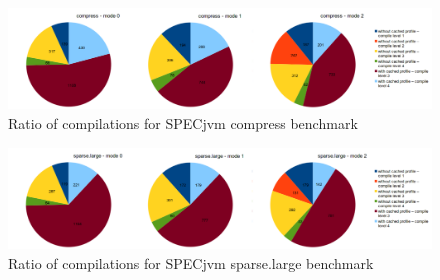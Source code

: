\begin{figure}[ht]
  \begin{center}
    \centering
    \includegraphics[width=1.0\textwidth]{figures/compress_compilations.png}
    \caption{Ratio of compilations for SPECjvm compress benchmark}
    \label{f:compress_compilations}
  \end{center}
\end{figure}
\begin{figure}[ht]
  \begin{center}
    \centering
    \includegraphics[width=1.0\textwidth]{figures/sparselarge_compilations.png}
    \caption{Ratio of compilations for SPECjvm sparse.large benchmark}
    \label{f:sparselarge_compilations}
  \end{center}
\end{figure}
\clearpage
